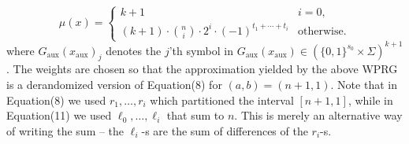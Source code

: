 \begin{equation}\tag{11}\mu(x)=\begin{cases}k+1&i=0,\\(k+1)\cdot\binom ni\cdot2^i\cdot(-1)^{t_1+\cdots+t_i}&\text{otherwise.}\end{cases}\end{equation}
where $G_{\mathrm{aux}}(x_{\mathrm{aux}})_j$ denotes the $j$'th symbol in $G_{\mathrm{aux}}(x_{\mathrm{aux}})\in(\{0,1\}^{s_0}\times\Sigma)^{k+1}$.
The weights are chosen so that the approximation yielded by the above WPRG is a derandomized version of Equation(8) for $(a,b)=(n+1,1)$. Note that in Equation(8) we used $r_1,\ldots,r_i$ which partitioned the interval $[n+1,1]$, while in Equation(11) we used $\ell_0,\ldots,\ell_i$ that sum to $n$. This is merely an alternative way of writing the sum -- the $\ell_i$-s are the sum of differences of the $r_i$-s.
